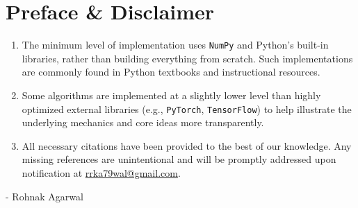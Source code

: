 \chapter*{Preface \& Disclaimer}

\begin{enumerate}[itemsep=0.3cm]
    \item The minimum level of implementation uses \texttt{NumPy} and Python’s built-in libraries, rather than building everything from scratch. Such implementations are commonly found in Python textbooks and instructional resources.

    \item Some algorithms are implemented at a slightly lower level than highly optimized external libraries (e.g., \texttt{PyTorch}, \texttt{TensorFlow}) to help illustrate the underlying mechanics and core ideas more transparently.

    \item All necessary citations have been provided to the best of our knowledge. Any missing references are unintentional and will be promptly addressed upon notification at \href{mailto:rrka79wal@gmail.com}{rrka79wal@gmail.com}.

\end{enumerate}

\vspace{1cm}

- Rohnak Agarwal










